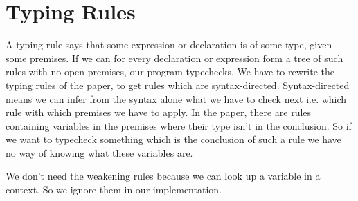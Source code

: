 \documentclass[a4paper,cleardoubleempty,BCOR1cm]{scrbook}
\begin{document}
\section{Typing Rules}
\label{sec:org11f03b3}
A typing rule says that some expression or declaration is of some type, given
some premises. If we can for every declaration or expression form a tree of
such rules with no open premises, our program typechecks. We have to rewrite
the typing rules of the paper, to get rules which are syntax-directed.
Syntax-directed means we can infer from the syntax alone what we have to check next
i.e. which rule with which premises we have to apply. In the paper, there are
rules containing variables in the premises where their type isn't in the
conclusion. So if we want to typecheck something which is the conclusion of
such a rule we have no way of knowing what these variables are.

We don't need the weakening rules because we can look up a variable in a
context.  So we ignore them in our implementation.
\end{document}
